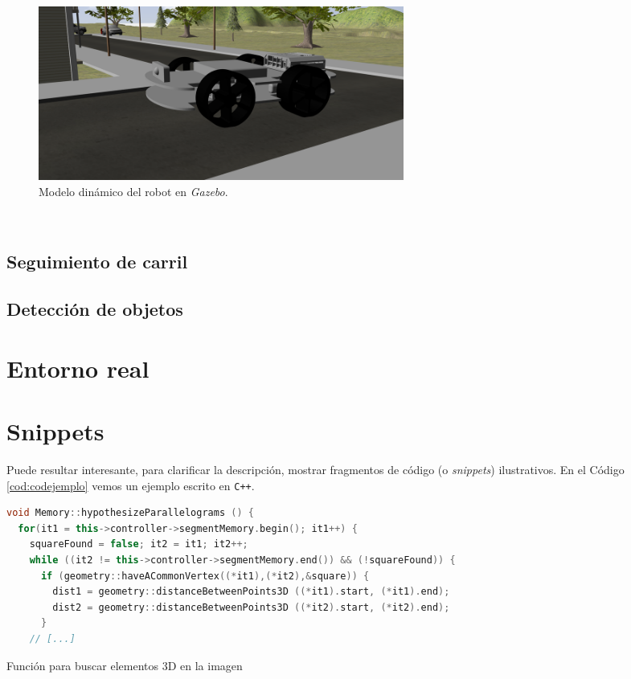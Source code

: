 \begin{figure} [h!]
	\begin{center}
		\includegraphics[width=12cm]{figs/modelGazebo}
	\end{center}
	\caption{Modelo dinámico del robot en \textit{Gazebo}.}
	\label{fig:modelGazebo}
\end{figure}\

\subsection{Seguimiento de carril}

\subsection{Detección de objetos}

\section{Entorno real}

\section{Snippets}

Puede resultar interesante, para clarificar la descripción, mostrar fragmentos de código (o \textit{snippets}) ilustrativos. En el Código \ref{cod:codejemplo} vemos un ejemplo escrito en \texttt{C++}.

\begin{code}[h]
	\begin{lstlisting}[language=C++]
void Memory::hypothesizeParallelograms () {
  for(it1 = this->controller->segmentMemory.begin(); it1++) {
    squareFound = false; it2 = it1; it2++;
    while ((it2 != this->controller->segmentMemory.end()) && (!squareFound)) {
      if (geometry::haveACommonVertex((*it1),(*it2),&square)) {
        dist1 = geometry::distanceBetweenPoints3D ((*it1).start, (*it1).end);
        dist2 = geometry::distanceBetweenPoints3D ((*it2).start, (*it2).end);
      }
    // [...]
\end{lstlisting}
	\caption[Función para buscar elementos 3D en la imagen]{Función para
		buscar elementos 3D en la imagen}
	\label{cod:codejemplo}
\end{code}

